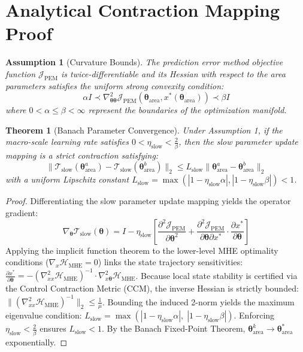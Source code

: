 \documentclass[10pt,journal,compsoc]{IEEEtran}
\newtheorem{theorem}{Theorem}
\newtheorem{assumption}{Assumption}
\begin{document}
\section{Analytical Contraction Mapping Proof}
\begin{assumption}[Curvature Bounds]
The prediction error method objective function $\mathcal{J}_{\text{PEM}}$ is twice-differentiable and its Hessian with respect to the area parameters satisfies the uniform strong convexity condition:
\begin{equation}
    \alpha I \bm{\prec} \nabla^2_{\bm{\theta}\bm{\theta}} \mathcal{J}_{\text{PEM}}(\bm{\theta}_{\text{area}}, x^*(\bm{\theta}_{\text{area}})) \bm{\prec} \beta I
\end{equation}
where $0 < \alpha \le \beta < \infty$ represent the boundaries of the optimization manifold.
\end{assumption}

\begin{theorem}[Banach Parameter Convergence]
Under Assumption 1, if the macro-scale learning rate satisfies $0 < \eta_{\text{slow}} < \frac{2}{\beta}$, then the slow parameter update mapping is a strict contraction satisfying:
\begin{equation}
    \|\mathcal{T}_{\text{slow}}(\bm{\theta}_{\text{area}}^a) - \mathcal{T}_{\text{slow}}(\bm{\theta}_{\text{area}}^b)\|_2 \le L_{\text{slow}} \|\bm{\theta}_{\text{area}}^a - \bm{\theta}_{\text{area}}^b\|_2
\end{equation}
with a uniform Lipschitz constant $L_{\text{slow}} = \max(|1 - \eta_{\text{slow}}\alpha|, |1 - \eta_{\text{slow}}\beta|) < 1$.
\end{theorem}

\begin{proof}
Differentiating the slow parameter update mapping yields the operator gradient:
\begin{equation}
    \nabla_{\bm{\theta}} \mathcal{T}_{\text{slow}}(\bm{\theta}) = I - \eta_{\text{slow}} \left[ \frac{\partial^2 \mathcal{J}_{\text{PEM}}}{\partial \bm{\theta}^2} + \frac{\partial^2 \mathcal{J}_{\text{PEM}}}{\partial \bm{\theta} \partial x^*} \cdot \frac{\partial x^*}{\partial \bm{\theta}} \right]
\end{equation}
Applying the implicit function theorem to the lower-level MHE optimality conditions ($\nabla_x \mathcal{H}_{\text{MHE}} = 0$) links the state trajectory sensitivities: $\frac{\partial x^*}{\partial \bm{\theta}} = - \left( \nabla^2_{xx} \mathcal{H}_{\text{MHE}} \right)^{-1} \cdot \nabla^2_{x\bm{\theta}} \mathcal{H}_{\text{MHE}}$. Because local state stability is certified via the Control Contraction Metric (CCM), the inverse Hessian is strictly bounded: $\|(\nabla^2_{xx} \mathcal{H}_{\text{MHE}})^{-1}\|_2 \le \frac{1}{\mu}$. Bounding the induced 2-norm yields the maximum eigenvalue condition: $L_{\text{slow}} = \max\left( |1 - \eta_{\text{slow}} \alpha|, \; |1 - \eta_{\text{slow}} \beta| \right)$. Enforcing $\eta_{\text{slow}} < \frac{2}{\beta}$ ensures $L_{\text{slow}} < 1$. By the Banach Fixed-Point Theorem, $\bm{\theta}_{\text{area}}^k \rightarrow \bm{\theta}_{\text{area}}^*$ exponentially.
\end{proof}
\end{document}
